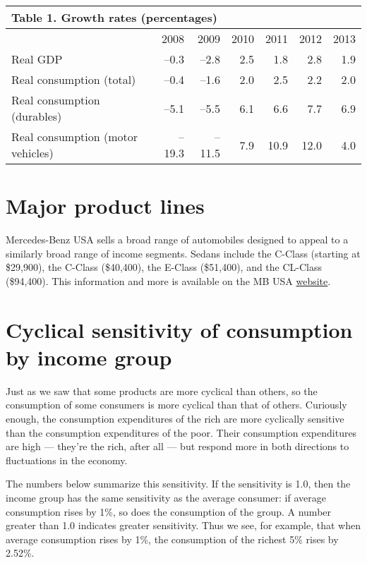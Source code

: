 \documentclass[letterpaper,12pt]{article}
\begin{document}
\begin{center}
\begin{tabular}{lrrrrrr}
\multicolumn{6}{l}{Table 1.  Growth rates (percentages)} \\
\toprule
        & 2008 & 2009 & 2010 & 2011 & 2012 & 2013 \\

\midrule
Real GDP
        & --0.3 & --2.8 & 2.5 & 1.8 & 2.8 & 1.9\\
Real consumption (total)
        & --0.4 & --1.6 & 2.0 & 2.5 & 2.2 & 2.0 \\
Real consumption (durables)
        & --5.1 & --5.5 & 6.1 & 6.6 & 7.7 & 6.9 \\
Real consumption (motor vehicles)
        & --19.3 & --11.5& 7.9 & 10.9 & 12.0 & 4.0 \\
\bottomrule
\end{tabular}
\end{center}

\section{Major product lines}

Mercedes-Benz USA sells a broad range of automobiles
designed to appeal to a similarly broad range of income segments.
Sedans include the C-Class (starting at \$29,900),
the C-Class (\$40,400),
the E-Class (\$51,400), and the CL-Class (\$94,400).
This information and more is available on the
MB USA
\href{http://www.mbusa.com/}{website}.


\section{Cyclical sensitivity of consumption by income group}

Just as we saw that some products are more cyclical than others,
so the consumption of some consumers is more cyclical than that of others.
Curiously enough, the consumption expenditures of the rich are more
cyclically sensitive than the consumption expenditures of the poor.
Their consumption expenditures are high --- they're the rich, after all ---
but respond more
in both directions to fluctuations in the economy.

The numbers below summarize this sensitivity.
If the sensitivity is 1.0, then the income group has the same sensitivity
as the average consumer:
if average consumption rises by 1\%, so does the consumption of the group.
A number greater than 1.0 indicates greater sensitivity.
Thus we see, for example, that when average consumption
rises by 1\%,
the consumption of the richest 5\%  rises by 2.52\%.
\end{document}
